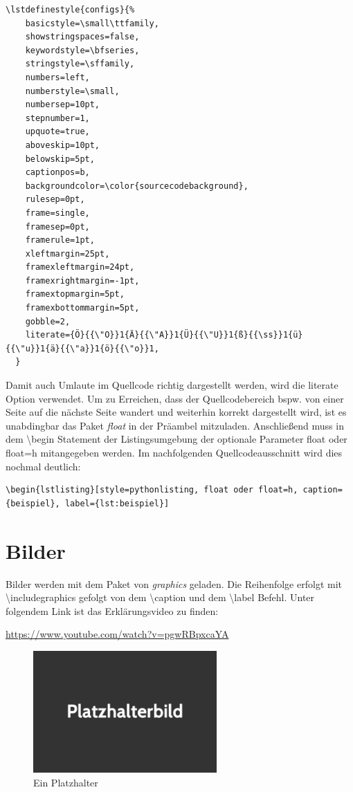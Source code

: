 \begin{lstlisting}[style=texlisting, caption={Quellcodeeinstellungen}, label={lst:quellcodeeinstellungen}]
  \lstdefinestyle{configs}{%
    basicstyle=\small\ttfamily,
    showstringspaces=false,
    keywordstyle=\bfseries,
    stringstyle=\sffamily,
    numbers=left,
    numberstyle=\small,
    numbersep=10pt,
    stepnumber=1,
    upquote=true,
    aboveskip=10pt,
    belowskip=5pt,
    captionpos=b,
    backgroundcolor=\color{sourcecodebackground},
    rulesep=0pt,
    frame=single,
    framesep=0pt,
    framerule=1pt,
    xleftmargin=25pt,
    framexleftmargin=24pt,
    framexrightmargin=-1pt,
    framextopmargin=5pt,
    framexbottommargin=5pt,
    gobble=2,
    literate={Ö}{{\"O}}1{Ä}{{\"A}}1{Ü}{{\"U}}1{ß}{{\ss}}1{ü}{{\"u}}1{ä}{{\"a}}1{ö}{{\"o}}1,
  }
\end{lstlisting}
		  
  		Damit auch Umlaute im Quellcode richtig dargestellt werden, wird die literate Option verwendet. 
  		Um zu Erreichen, dass der Quellcodebereich bspw. von einer Seite auf die nächste Seite wandert und weiterhin 
  		korrekt dargestellt wird, ist es unabdingbar das Paket \emph{float} in der Präambel mitzuladen. 
  		Anschließend muss in dem \textbackslash begin Statement der Listingsumgebung der optionale Parameter float oder float=h mitangegeben 
  		werden. Im nachfolgenden Quellcodeausschnitt wird dies nochmal deutlich:
  		
\begin{lstlisting}[style=texlisting, caption={Float Beispiel bei Quellcodebereich}, label={lst:floatbeispiel}]
  \begin{lstlisting}[style=pythonlisting, float oder float=h, caption={beispiel}, label={lst:beispiel}]
\end{lstlisting}
	\newpage
	
	\section{Bilder}
		\label{sec:bilder}
		Bilder werden mit dem Paket von \emph{graphics} geladen. Die Reihenfolge erfolgt mit \textbackslash includegraphics gefolgt von dem \textbackslash caption und dem \textbackslash label Befehl.
		Unter folgendem Link ist das Erklärungsvideo zu finden:
		
		\url{https://www.youtube.com/watch?v=pgwRBpxcaYA}
		\begin{figure}[htb]%
			\centering
			\includegraphics[width=7cm]{pictures/platzhalter}
			\caption{Ein Platzhalter}
			\label{fig:platzhalter}
		\end{figure}
	
